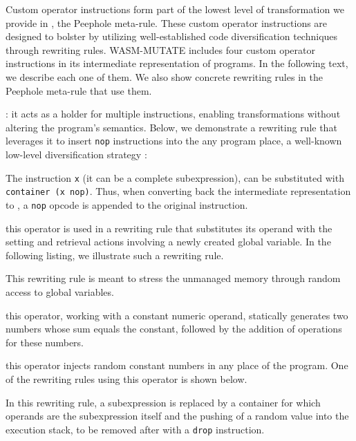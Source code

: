 Custom operator instructions form part of the lowest level of transformation we provide in \tool, the Peephole meta-rule.
These custom operator instructions are designed to bolster \tool by utilizing well-established code diversification techniques through rewriting rules.
WASM-MUTATE includes four custom operator instructions in its intermediate representation of \wasm programs.
In the following text, we describe each one of them.
We also show concrete rewriting rules in the Peephole meta-rule that use them.

: it acts as a holder for multiple instructions, enabling transformations without altering the program's semantics. 
Below, we demonstrate a rewriting rule that leverages it to insert \texttt{nop} instructions into the any \Wasm program place, a well-known low-level diversification strategy \cite{nop}:



\noindent The instruction \texttt{x} (it can be a complete subexpression), can be substituted with \texttt{container (x nop)}. Thus, when converting back the intermediate representation to \wasm, a \texttt{nop} opcode is appended to the original instruction.


 this operator is used in a rewriting rule that substitutes its operand with the setting and retrieval actions involving a newly created global variable. In the following listing, we illustrate such a rewriting rule.



\noindent This rewriting rule is meant to stress the unmanaged memory through random access to global variables.

 this operator, working with a constant numeric operand, statically generates two numbers whose sum equals the constant, followed by the addition of operations for these numbers.



 this operator injects random constant numbers in any place of the program. One of the rewriting rules using this operator is shown below.



\noindent In this rewriting rule, a subexpression is replaced by a container for which operands are the subexpression itself and the pushing of a random value into the execution stack, to be removed after with a \texttt{drop} instruction.

